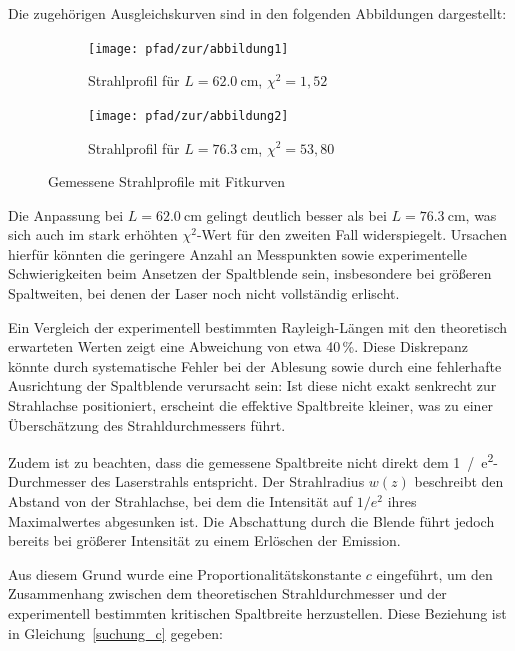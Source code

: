 Die zugehörigen Ausgleichskurven sind in den folgenden Abbildungen dargestellt:

\begin{figure}[htbp]
    \centering
    \begin{subfigure}[t]{0.48\textwidth}
        \centering
        \texttt{[image: pfad/zur/abbildung1]}
        \caption{Strahlprofil für \(L = \SI{62.0}{\centi\meter}\), \(\chi^2 = 1{,}52\)}
        \label{fig:62}
    \end{subfigure}
    \hfill
    \begin{subfigure}[t]{0.48\textwidth}
        \centering
        \texttt{[image: pfad/zur/abbildung2]}
        \caption{Strahlprofil für \(L = \SI{76.3}{\centi\meter}\), \(\chi^2 = 53{,}80\)}
        \label{fig:76}
    \end{subfigure}
    \caption{Gemessene Strahlprofile mit Fitkurven}
\end{figure}

Die Anpassung bei \(L = \SI{62.0}{\centi\meter}\) gelingt deutlich besser als bei \(L = \SI{76.3}{\centi\meter}\), was sich auch im stark erhöhten \(\chi^2\)-Wert für den zweiten Fall widerspiegelt. 
Ursachen hierfür könnten die geringere Anzahl an Messpunkten sowie experimentelle Schwierigkeiten beim Ansetzen der Spaltblende sein, insbesondere bei größeren Spaltweiten, bei denen der Laser noch nicht vollständig erlischt.

Ein Vergleich der experimentell bestimmten Rayleigh-Längen mit den theoretisch erwarteten Werten zeigt eine Abweichung von etwa 40\,\%. 
Diese Diskrepanz könnte durch systematische Fehler bei der Ablesung sowie durch eine fehlerhafte Ausrichtung der Spaltblende verursacht sein: 
Ist diese nicht exakt senkrecht zur Strahlachse positioniert, erscheint die effektive Spaltbreite kleiner, was zu einer Überschätzung des Strahldurchmessers führt.

Zudem ist zu beachten, dass die gemessene Spaltbreite nicht direkt dem \SI{1}{/e^2}-Durchmesser des Laserstrahls entspricht. 
Der Strahlradius \( w(z) \) beschreibt den Abstand von der Strahlachse, bei dem die Intensität auf \( 1/e^2 \) ihres Maximalwertes abgesunken ist. 
Die Abschattung durch die Blende führt jedoch bereits bei größerer Intensität zu einem Erlöschen der Emission.

Aus diesem Grund wurde eine Proportionalitätskonstante \( c \) eingeführt, um den Zusammenhang zwischen dem theoretischen Strahldurchmesser und der experimentell bestimmten kritischen Spaltbreite herzustellen. 
Diese Beziehung ist in Gleichung~\eqref{suchung_c} gegeben:

